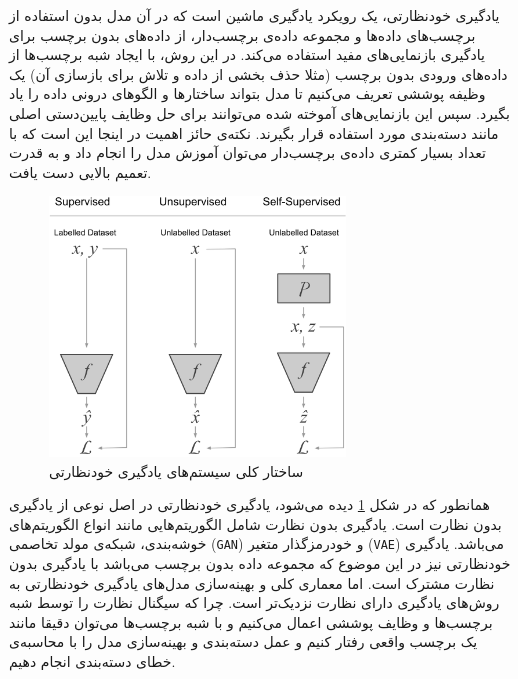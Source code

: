 یادگیری خودنظارتی، یک رویکرد یادگیری ماشین است که در آن مدل بدون استفاده از برچسب‌های داده‌ها و مجموعه داده‌ی برچسب‌دار، از داده‌های بدون برچسب برای یادگیری بازنمایی‌های مفید استفاده می‌کند. در این روش، با ایجاد شبه برچسب‌ها از داده‌های ورودی بدون برچسب (مثلا حذف بخشی از داده و تلاش برای بازسازی آن) یک وظیفه پوششی تعریف می‌کنیم تا مدل بتواند ساختارها و الگوهای درونی داده را یاد بگیرد. سپس این بازنمایی‌های آموخته شده می‌توانند برای حل وظایف پایین‌دستی اصلی مانند دسته‌بندی مورد استفاده قرار بگیرند. نکته‌ی حائز اهمیت در اینجا این است که با تعداد بسیار کمتری داده‌ی برچسب‌دار می‌توان آموزش مدل را انجام داد و به قدرت تعمیم بالایی دست یافت.

\begin{figure}[htbp]
  \centering
  \includegraphics[width=0.7\textwidth]{Images/Chapter2/self-vs-unsupervised.png}
  \caption{ساختار کلی سیستم‌های یادگیری خودنظارتی}
  \label{fig:self-vs-unsupervised}
\end{figure}

همانطور که در شکل \ref{fig:self-vs-unsupervised}
دیده می‌شود، یادگیری خودنظارتی در اصل نوعی از یادگیری بدون نظارت است\cite{ericsson2022self}.
یادگیری بدون نظارت شامل الگوریتم‌هایی مانند انواع
الگوریتم‌های خوشه‌بندی،
شبکه‌ی مولد تخاصمی (\verb|GAN|)
و خودرمزگذار متغیر (\verb|VAE|)
می‌باشد. یادگیری خودنظارتی نیز در این موضوع که مجموعه داده بدون برچسب می‌باشد با یادگیری بدون نظارت مشترک است. اما معماری کلی و
بهینه‌سازی
مدل‌های یادگیری خودنظارتی به روش‌های یادگیری دارای نظارت نزدیک‌تر است. چرا که سیگنال نظارت را توسط شبه برچسب‌ها و وظایف پوششی اعمال می‌کنیم و با شبه برچسب‌ها می‌توان دقیقا مانند یک برچسب واقعی رفتار کنیم و عمل دسته‌بندی و بهینه‌سازی مدل را با محاسبه‌ی خطای دسته‌بندی انجام دهیم.


